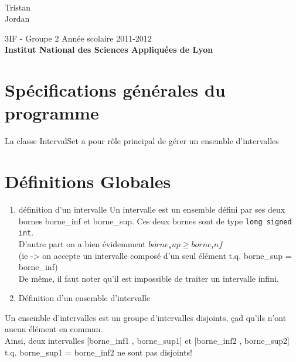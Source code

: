 \documentclass[a4paper,french,10pt,twoside]{article}
\begin{document}
\begin{center}
	\vspace*{1cm}
	\LARGE {}\\ \vspace{10pt}\large \color{black} Tristan  \\ Jordan  \\
				   \vspace*{1.5cm}

				   \vspace*{1cm}

				   \Large 3IF - Groupe 2 \hfill Ann\'ee scolaire 2011-2012\\
				   \vspace*{1cm}
				   \textbf{\Large Institut National des Sciences Appliqu\'{e}es de Lyon} \pagebreak
				 \end{center}






\part{Spécifications générales du programme}
La classe IntervalSet a pour rôle principal de gérer un ensemble d'intervalles

\part{Définitions Globales}

\begin{enumerate}
\item{définition d'un intervalle}
\newline{}
Un intervalle est un ensemble défini par ses deux bornes borne\_inf et borne\_sup.
Ces deux bornes sont de type \verb!long signed int!.\\
D'autre part on a bien évidemment $borne_sup \geq borne_inf$\\
(ie -> on accepte un intervalle composé d'un seul élément t.q. borne\_sup = borne\_inf)\\
De même, il faut noter qu'il est impossible de traiter un intervalle infini.


\item{Définition d'un ensemble d'intervalle}
\newline{}
\end{enumerate}
Un ensemble d'intervalles est un groupe d'intervalles disjoints, çad qu'ils n'ont aucun élément en commun.\\
Ainsi, deux intervalles [borne\_inf1 , borne\_sup1] et [borne\_inf2 , borne\_sup2] t.q. borne\_sup1 = borne\_inf2 ne sont pas disjoints!
\end{document}
